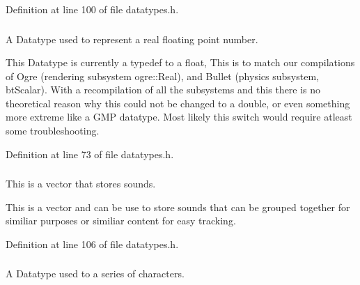Definition at line 100 of file datatypes.h.

\hypertarget{namespacephys_af7eb897198d265b8e868f45240230d5f}{
\subsubsection[{Real}]{}}
\label{df/dec/namespacephys_af7eb897198d265b8e868f45240230d5f}


A Datatype used to represent a real floating point number. 

This Datatype is currently a typedef to a float, This is to match our compilations of Ogre (rendering subsystem ogre::Real), and Bullet (physics subsystem, btScalar). With a recompilation of all the subsystems and this there is no theoretical reason why this could not be changed to a double, or even something more extreme like a GMP datatype. Most likely this switch would require atleast some troubleshooting. 

Definition at line 73 of file datatypes.h.

\hypertarget{namespacephys_ab780c3162da5699fe421f3739ba03fc4}{
\subsubsection[{SoundSet}]{}}
\label{df/dec/namespacephys_ab780c3162da5699fe421f3739ba03fc4}


This is a vector that stores sounds. 

This is a vector and can be use to store sounds that can be grouped together for similiar purposes or similiar content for easy tracking. 

Definition at line 106 of file datatypes.h.

\hypertarget{namespacephys_aa03900411993de7fbfec4789bc1d392e}{
\subsubsection[{String}]{}}
\label{df/dec/namespacephys_aa03900411993de7fbfec4789bc1d392e}


A Datatype used to a series of characters. 

